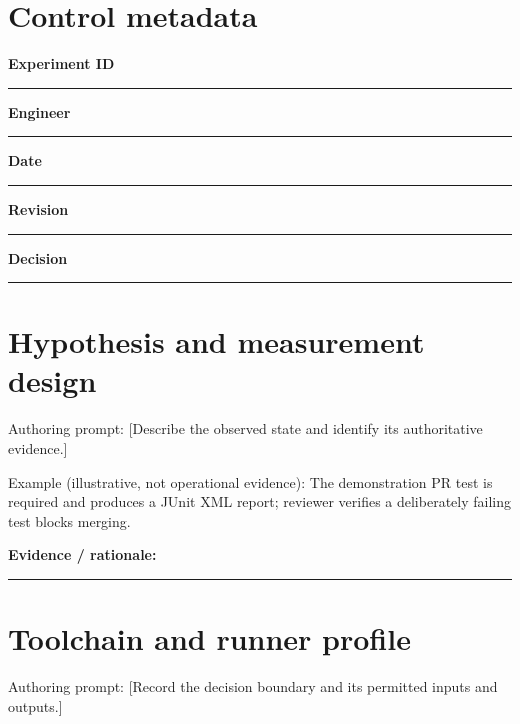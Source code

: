 \documentclass[11pt,letterpaper]{article}
\begin{document}
\makedoctitle\makedocsummary
\section{Control metadata}
\noindent\textbf{Experiment ID}\par\nobreak\vspace{6pt}\noindent\rule{0.93\linewidth}{0.4pt}\par\vspace{14pt}
\noindent\textbf{Engineer}\par\nobreak\vspace{6pt}\noindent\rule{0.93\linewidth}{0.4pt}\par\vspace{14pt}
\noindent\textbf{Date}\par\nobreak\vspace{6pt}\noindent\rule{0.93\linewidth}{0.4pt}\par\vspace{14pt}
\noindent\textbf{Revision}\par\nobreak\vspace{6pt}\noindent\rule{0.93\linewidth}{0.4pt}\par\vspace{14pt}
\noindent\textbf{Decision}\par\nobreak\vspace{6pt}\noindent\rule{0.93\linewidth}{0.4pt}\par\vspace{14pt}
\section{Hypothesis and measurement design}
Authoring prompt: [Describe the observed state and identify its authoritative evidence.]

Example (illustrative, not operational evidence): The demonstration PR test is required and produces a JUnit XML report; reviewer verifies a deliberately failing test blocks merging.

\noindent\textbf{Evidence / rationale:}\par\nobreak\vspace{8pt}\noindent\rule{0.93\linewidth}{0.4pt}\par\vspace{14pt}
\section{Toolchain and runner profile}
Authoring prompt: [Record the decision boundary and its permitted inputs and outputs.]
\end{document}
